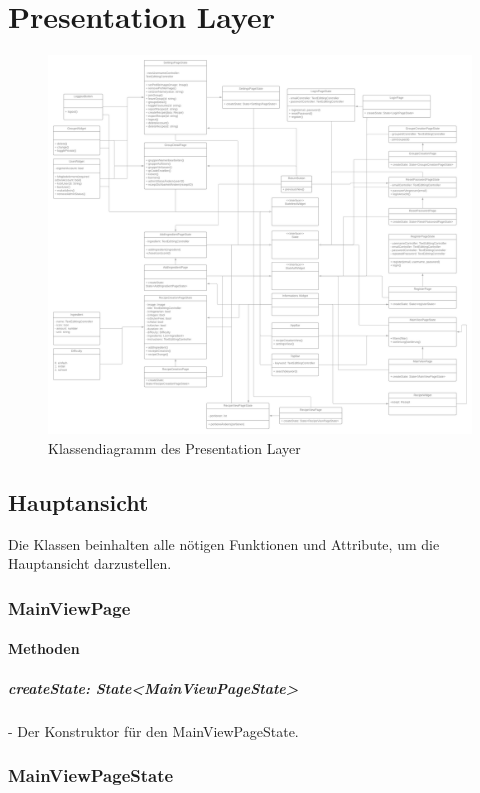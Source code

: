 \documentclass[parskip=full]{scrartcl}
\begin{document}
\section{Presentation Layer}
\begin{figure}[htp]
    \centering
    \includegraphics[width = \textwidth]{images/presentationLayer/presentationLayer.png}
    \caption{Klassendiagramm des Presentation Layer}
    \label{fig:presentation-layer}
\end{figure}

\newpage

\subsection{Hauptansicht}
    Die Klassen beinhalten alle nötigen Funktionen und Attribute, um die Hauptansicht darzustellen.

    \subsubsection{MainViewPage}
        \paragraph*{Methoden}
            \subparagraph*{createState: State<MainViewPageState>} - Der Konstruktor für den MainViewPageState.

    \subsubsection{MainViewPageState}
\end{document}
